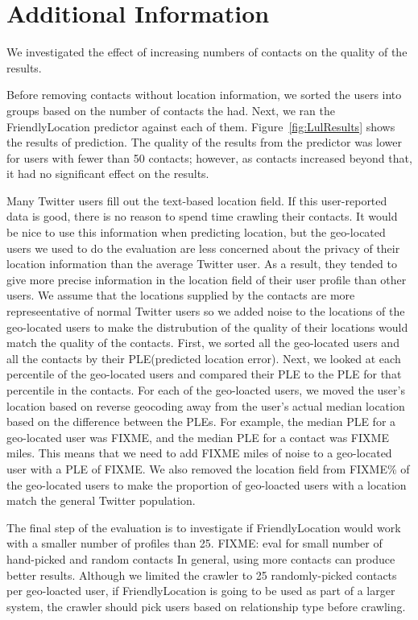 \section{Additional Information}
We investigated the effect of increasing numbers of contacts on the quality of
the results.

Before removing contacts without location information, we sorted the users into
groups based on the number of contacts the had.
Next, we ran the FriendlyLocation predictor against each of them.
Figure~\ref{fig:LulResults} shows the results of prediction.
The quality of the results from the predictor was lower for users with fewer
than 50 contacts; however, as contacts increased beyond that, it had no
significant effect on the results.

Many Twitter users fill out the text-based location field.
%
If this user-reported data is good, there is no reason to spend time crawling
their contacts.
%
It would be nice to use this information when predicting location, but
the geo-located users we used to do the evaluation are less concerned about the
privacy of their location information than the average Twitter user.
%
As a result, they tended to give more precise information in the location field
of their user profile than other users.
%
We assume that the locations supplied by the contacts are more represeentative
of normal Twitter users so we added noise to the locations of the geo-located
users to make the distrubution of the quality of their locations would match
the quality of the contacts.
%
First, we sorted all the geo-located users and all the contacts by their
PLE(predicted location error).
%
Next, we looked at each percentile of the geo-located users and compared their
PLE to the PLE for that percentile in the contacts.
%
For each of the geo-loacted users, we moved the user's location based on
reverse geocoding away from the user's actual median location based on the
difference between the PLEs.
%
For example, the median PLE for a geo-located user was FIXME, and the median
PLE for a contact was FIXME miles.
%
This means that we need to add FIXME miles of noise to a geo-located user with
a PLE of FIXME.
%
We also removed the location field from FIXME\% of the geo-located users to
make the proportion of geo-loacted users with a location match the general
Twitter population.

The final step of the evaluation is to investigate if FriendlyLocation would
work with a smaller number of profiles than 25.
%
FIXME: eval for small number of hand-picked and random contacts
%
In general, using more contacts can produce better results.
%
Although we limited the crawler to 25 randomly-picked contacts per geo-loacted
user, if FriendlyLocation is going to be used as part of a larger system, the
crawler should pick users based on relationship type before crawling.
